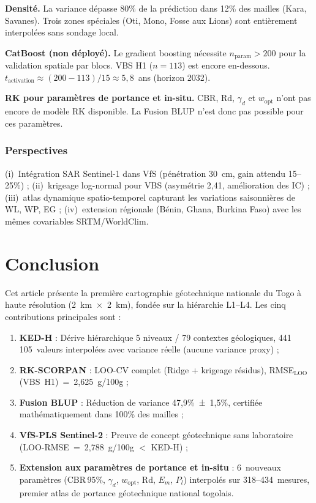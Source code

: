 \documentclass[10pt,a4paper,twocolumn]{article}
\begin{document}
\textbf{Densité.} La variance dépasse 80\% de la prédiction dans 12\% des mailles
(Kara, Savanes). Trois zones spéciales (Oti, Mono, Fosse aux Lions) sont
entièrement interpolées sans sondage local.

\textbf{CatBoost (non déployé).} Le gradient boosting nécessite
$n_{\mathrm{param}} > 200$ pour la validation spatiale par blocs.
VBS H1 ($n=113$) est encore en-dessous.
$t_{\mathrm{activation}} \approx (200-113)/15 \approx 5{,}8$~ans (horizon 2032).

\textbf{RK pour paramètres de portance et in-situ.} CBR, Rd, $\gamma_d$ et $w_{\mathrm{opt}}$
n'ont pas encore de modèle RK disponible. La Fusion BLUP n'est donc pas
possible pour ces paramètres.

\subsubsection{Perspectives}

(i)~Intégration SAR Sentinel-1 dans VfS (pénétration 30~cm, gain attendu 15--25\%) ;
(ii)~krigeage log-normal pour VBS (asymétrie 2{,}41, amélioration des IC) ;
(iii)~atlas dynamique spatio-temporel capturant les variations saisonnières
de WL, WP, EG \cite{gundogdu2007spatial} ;
(iv)~extension régionale (Bénin, Ghana, Burkina Faso) avec les mêmes
covariables SRTM/WorldClim.

\section{Conclusion}
\label{sec:conclusion}

Cet article présente la première cartographie géotechnique nationale du Togo
à haute résolution (2~km~$\times$~2~km), fondée sur la hiérarchie L1--L4.
Les cinq contributions principales sont :

\begin{enumerate}[noitemsep]
  \item \textbf{KED-H} : Dérive hiérarchique 5 niveaux / 79 contextes géologiques,
    441\,105~valeurs interpolées avec variance réelle (aucune variance proxy) ;

  \item \textbf{RK-SCORPAN} : LOO-CV complet (Ridge + krigeage résidus),
    RMSE$_\mathrm{LOO}$(VBS~H1)~=~2{,}625~g/100g ;

  \item \textbf{Fusion BLUP} : Réduction de variance 47{,}9\%~±~1{,}5\%,
    certifiée mathématiquement dans 100\% des mailles ;

  \item \textbf{VfS-PLS Sentinel-2} : Preuve de concept géotechnique sans
    laboratoire (LOO-RMSE~=~2{,}788~g/100g $<$ KED-H) ;

  \item \textbf{Extension aux paramètres de portance et in-situ} : 6~nouveaux paramètres (CBR\,95\%, $\gamma_d$,
    $w_{\mathrm{opt}}$, Rd, $E_m$, $P_l$) interpolés sur 318--434~mesures,
    premier atlas de portance géotechnique national togolais.
\end{enumerate}
\end{document}

